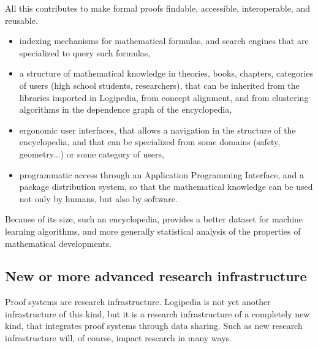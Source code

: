 All this contributes to make formal proofs findable, accessible,
interoperable, and reusable.

\begin{itemize}
\item indexing mechanisms for mathematical formulas, and search engines
  that are specialized to query such formulas,

  \item a structure of mathematical knowledge in theories, books,
    chapters, categories of users (high school students, researchers),
    that can be inherited from the libraries imported in {\sf
      Logipedia}, from concept alignment, and from clustering
    algorithms in the dependence graph of the encyclopedia,

  \item ergonomic user interfaces, that allows a navigation in the
    structure of the encyclopedia, and that can be specialized from
    some domains (safety, geometry...) or some category of users,

  \item programmatic access through an Application Programming
    Interface, and a package distribution system, so that the
    mathematical knowledge can be used not only by humans, but also by
    software.
\end{itemize}

Because of its size, such an encyclopedia, provides a better dataset
for machine learning algorithms, and more generally statistical
analysis of the properties of mathematical developments.

\subsection{New or more advanced research infrastructure}

Proof systems are research infrastructure. {\sf Logipedia} is not yet
another infrastructure of this kind, but it is a research
infrastructure of a completely new kind, that integrates proof systems
through data sharing.  Such as new research infrastructure will, of
course, impact research in many ways.

